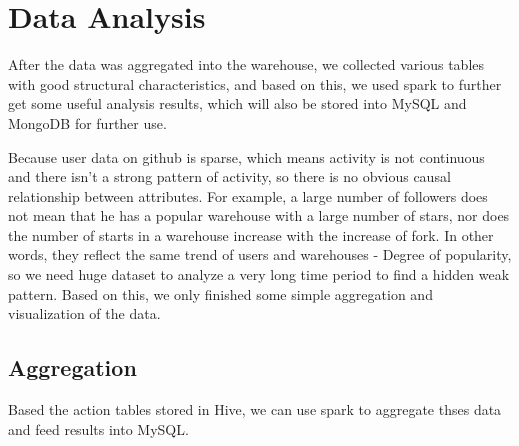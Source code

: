 \section{Data Analysis}

After the data was aggregated into the warehouse, we collected various tables with good structural characteristics, and based on this, we used spark to further get some useful analysis results, which will also be stored into MySQL and MongoDB for further use.


Because user data on github is sparse, which means activity is not continuous and there isn't a strong pattern of activity, so there is no obvious causal relationship between attributes. For example, a large number of followers does not mean that he has a popular warehouse with a large number of stars, nor does the number of starts in a warehouse increase with the increase of fork. In other words, they reflect the same trend of users and warehouses - Degree of popularity, so we need huge dataset to analyze a very long time period to find a hidden weak pattern. Based on this, we only finished some simple aggregation and visualization of the data.


\subsection{Aggregation}

Based the action tables stored in Hive, we can use spark to aggregate thses data and feed results into MySQL.


